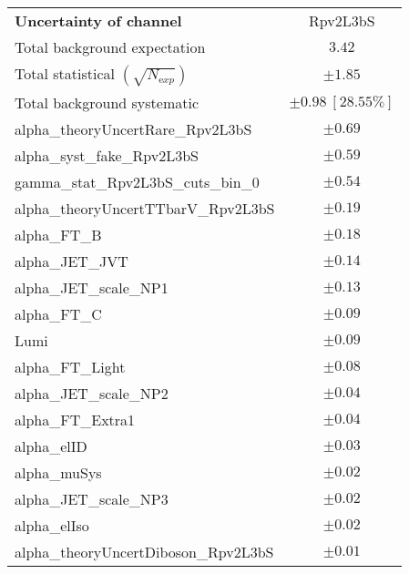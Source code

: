 
\begin{table}
\begin{center}
\setlength{\tabcolsep}{0.0pc}
\begin{tabular*}{\textwidth}{@{\extracolsep{\fill}}lc}
\noalign{\smallskip}\hline\noalign{\smallskip}
{\bfseries Uncertainty of channel}                                    & Rpv2L3bS            \\
\noalign{\smallskip}\hline\noalign{\smallskip}
Total background expectation             &  $3.42$       \\
\noalign{\smallskip}\hline\noalign{\smallskip}
Total statistical $(\sqrt{N_{\mathrm exp}})$              & $\pm 1.85$       \\
Total background systematic               & $\pm 0.98\ [28.55\%] $             \\
\noalign{\smallskip}\hline\noalign{\smallskip}
\noalign{\smallskip}\hline\noalign{\smallskip}
alpha\_theoryUncertRare\_Rpv2L3bS         & $\pm 0.69$       \\
alpha\_syst\_fake\_Rpv2L3bS         & $\pm 0.59$       \\
gamma\_stat\_Rpv2L3bS\_cuts\_bin\_0         & $\pm 0.54$       \\
alpha\_theoryUncertTTbarV\_Rpv2L3bS         & $\pm 0.19$       \\
alpha\_FT\_B         & $\pm 0.18$       \\
alpha\_JET\_JVT         & $\pm 0.14$       \\
alpha\_JET\_scale\_NP1         & $\pm 0.13$       \\
alpha\_FT\_C         & $\pm 0.09$       \\
Lumi         & $\pm 0.09$       \\
alpha\_FT\_Light         & $\pm 0.08$       \\
alpha\_JET\_scale\_NP2         & $\pm 0.04$       \\
alpha\_FT\_Extra1         & $\pm 0.04$       \\
alpha\_elID         & $\pm 0.03$       \\
alpha\_muSys         & $\pm 0.02$       \\
alpha\_JET\_scale\_NP3         & $\pm 0.02$       \\
alpha\_elIso         & $\pm 0.02$       \\
alpha\_theoryUncertDiboson\_Rpv2L3bS         & $\pm 0.01$       \\

\end{tabular*}
\end{center}
\end{table}
